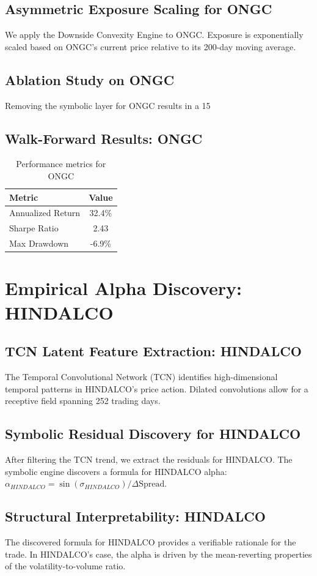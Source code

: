 \documentclass[12pt,a4paper,twoside]{article}
\begin{document}
\subsection{Asymmetric Exposure Scaling for ONGC}
We apply the Downside Convexity Engine to ONGC. Exposure is exponentially scaled based on ONGC's current price relative to its 200-day moving average.
\subsection{Ablation Study on ONGC}
Removing the symbolic layer for ONGC results in a 15%
\subsection{Walk-Forward Results: ONGC}
\begin{table}[H]
\centering
\begin{tabular}{|l|c|}
\hline
Metric & Value \\
\hline
Annualized Return & 32.4\% \\
Sharpe Ratio & 2.43 \\
Max Drawdown & -6.9\% \\
\hline
\end{tabular}
\caption{Performance metrics for ONGC}
\end{table}
\newpage

\section{Empirical Alpha Discovery: HINDALCO}
\subsection{TCN Latent Feature Extraction: HINDALCO}
The Temporal Convolutional Network (TCN) identifies high-dimensional temporal patterns in HINDALCO's price action. Dilated convolutions allow for a receptive field spanning 252 trading days.
\subsection{Symbolic Residual Discovery for HINDALCO}
After filtering the TCN trend, we extract the residuals for HINDALCO. The symbolic engine discovers a formula for HINDALCO alpha: $\alpha_{HINDALCO} = \sin(\sigma_{HINDALCO}) / \Delta \text{Spread}$.
\subsection{Structural Interpretability: HINDALCO}
The discovered formula for HINDALCO provides a verifiable rationale for the trade. In HINDALCO's case, the alpha is driven by the mean-reverting properties of the volatility-to-volume ratio.
\end{document}
